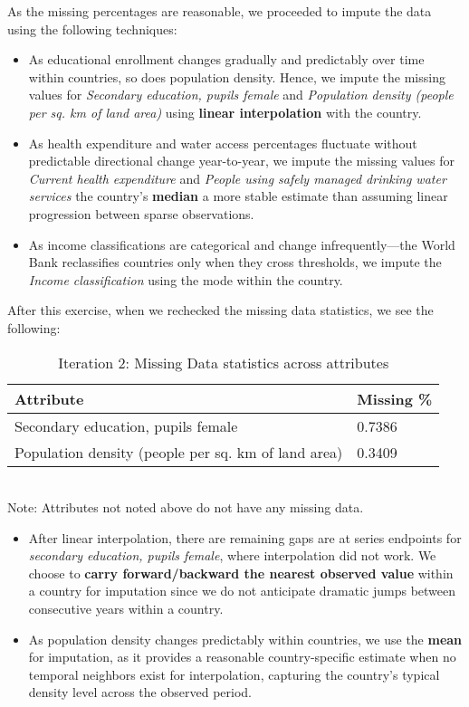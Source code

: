 \documentclass[10pt,a4paper]{article}
\begin{document}
    As the missing percentages are reasonable, we proceeded to impute the data using the following techniques:
    \begin{itemize}
    \item As educational enrollment changes gradually and predictably over time within countries, so does population density. Hence, we impute the missing values for \textit{Secondary education, pupils female} and \textit{Population density (people per sq. km of land area)} using \textbf{linear interpolation} with the country.
    \item As health expenditure and water access percentages fluctuate without predictable directional change year-to-year, we impute the missing values for \textit{Current health expenditure} and \textit{People using safely managed drinking water services} the country's \textbf{median} a more stable estimate than assuming linear progression between sparse observations.
    \item As income classifications are categorical and change infrequently—the World Bank reclassifies countries only when they cross thresholds, we impute the \textit{Income classification} using the mode within the country.
    \end{itemize}

    After this exercise, when we rechecked the missing data statistics, we see the following:

            \begin{table}[H]
            \centering
            \caption{Iteration 2: Missing Data statistics across attributes}
            \label{tab:table}
            \begin{tabular}{ll}
                \toprule
                \textbf{Attribute} & \textbf{Missing \%} \\
                \midrule
                Secondary education, pupils female &  0.7386 \\
                Population density (people per sq. km of land area) & 0.3409 \\
                \bottomrule   
            \end{tabular} \\
            \footnotesize{Note: Attributes not noted above do not have any missing data.}\\
        \end{table}

    \begin{itemize}
    \item After linear interpolation, there are remaining gaps are at series endpoints for \textit{secondary education, pupils female}, where interpolation did not work. We choose to \textbf{carry forward/backward the nearest observed value} within a country for imputation since we do not anticipate dramatic jumps between consecutive years within a country.
    \item As population density changes predictably within countries, we use the \textbf{mean} for imputation, as it provides a reasonable country-specific estimate when no temporal neighbors exist for interpolation, capturing the country's typical density level across the observed period.
    \end{itemize}
\end{document}
